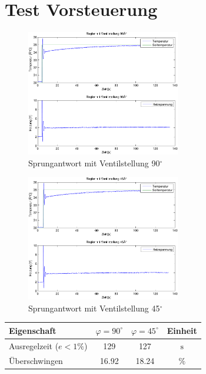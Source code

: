 \section{Test Vorsteuerung}
\begin{figure}[h!]
    \centering
    \includegraphics[width=0.6\textwidth]{11/vorsteuerung_full_plot.pdf}
    \caption{Sprungantwort mit Ventilstellung 90$^\circ$}
    \label{fig:11a}
\end{figure}
\begin{figure}[h!]
    \centering
    \includegraphics[width=0.6\textwidth]{11/vorsteuerung_half_plot.pdf}
    \caption{Sprungantwort mit Ventilstellung 45$^\circ$}
    \label{fig:11b}
\end{figure}
\begin{table}[h!]
	\centering
	\begin{tabular}{l c c c}
		Eigenschaft
			& $\varphi = 90^\circ$
			& $\varphi = 45^\circ$ 
			& Einheit\\
		\hline
		Ausregelzeit ($e < 1\%$)
			& 129
			& 127
            & $\si{\second}$ \\
		Überschwingen
			& 16.92
			& 18.24
			& $\%$
	\end{tabular}
\end{table}

